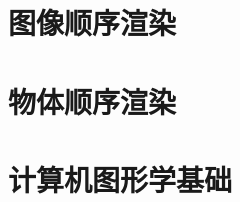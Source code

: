\documentclass{notebook-neon}
\begin{document}
\tableofcontents
\listoffigures
\listoftables

\mainmatter

\nocite{*}

\part{图像顺序渲染}


\part{物体顺序渲染}





\part{计算机图形学基础}






\appendix

\backmatter


\end{document}
